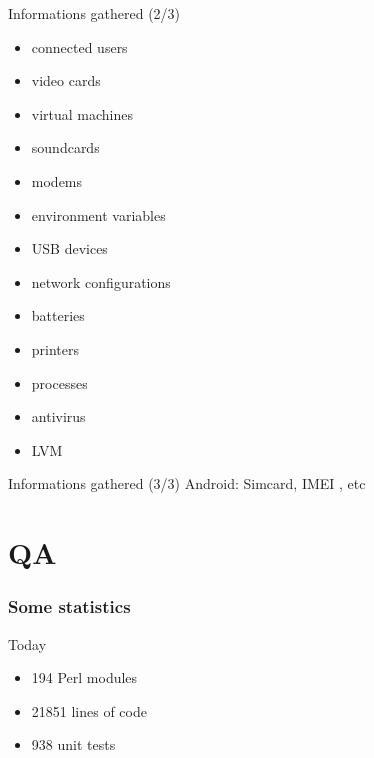 \documentclass{beamer}
\begin{document}
\begin{frame}
    \begin{block}{Informations gathered (2/3)}
        \begin{itemize}
        \item connected users
        \item video cards
        \item virtual machines
        \item soundcards
        \item modems
        \item environment variables
        \item USB devices
        \item network configurations
        \item batteries
        \item printers
        \item processes
        \item antivirus
        \item LVM
        \end{itemize}
    \end{block}
\end{frame}

\begin{frame}
    \begin{block}{Informations gathered (3/3)}
        Android: Simcard, IMEI , etc
    \end{block}
\end{frame}

\section{QA}

\begin{frame}
    \frametitle{Some statistics}

    \begin{block}{Today}
        \begin{itemize}
            \item 194 Perl modules
            \item 21851 lines of code
            \item 938 unit tests
        \end{itemize}
    \end{block}

\end{frame}
\end{document}
